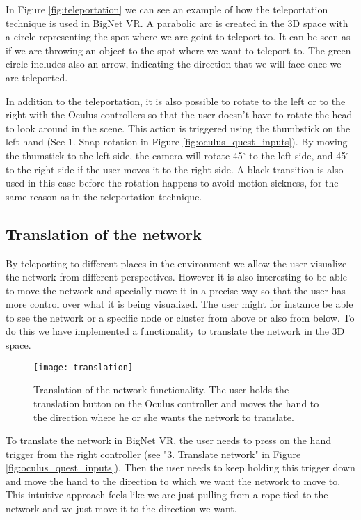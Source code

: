 In Figure \ref{fig:teleportation} we can see an example of how the teleportation technique is used in BigNet VR. A  parabolic arc is created in the 3D space with a circle representing the spot where we are goint to teleport to. It can be seen as if we are throwing an object to the spot where we want to teleport to. The green circle includes also an arrow, indicating the direction that we will face once we are teleported.

In addition to the teleportation, it is also possible to rotate to the left or to the right with the Oculus controllers so that the user doesn't have to rotate the head to look around in the scene. This action is triggered using the thumbstick on the left hand (See 1. Snap rotation in Figure \ref{fig:oculus_quest_inputs}). By moving the thumstick to the left side, the camera will rotate 45$^{\circ}$ to the left side, and 45$^{\circ}$ to the right side if the user moves it to the right side. A black transition is also used in this case before the rotation happens to avoid motion sickness, for the same reason as in the teleportation technique.

\subsection{Translation of the network}
By teleporting to different places in the environment we allow the user visualize the network from different perspectives. However it is also interesting to be able to move the network and specially move it in a precise way so that the user has more control over what it is being visualized. The user might for instance be able to see the network or a specific node or cluster from above or also from below. To do this we have implemented a functionality to translate the network in the 3D space.

\begin{figure}[h!]
    \centering%
    \texttt{[image: translation]}
    \caption{Translation of the network functionality. The user holds the translation button on the Oculus controller and moves the hand to the direction where he or she wants the network to translate.}
    \label{fig:translation}
\end{figure}%

To translate the network in BigNet VR, the user needs to press on the hand trigger from the right controller (see "3. Translate network" in Figure \ref{fig:oculus_quest_inputs}). Then the user needs to keep holding this trigger down and move the hand to the direction to which we want the network to move to. This intuitive approach feels like we are just pulling from a rope tied to the network and we just move it to the direction we want.



